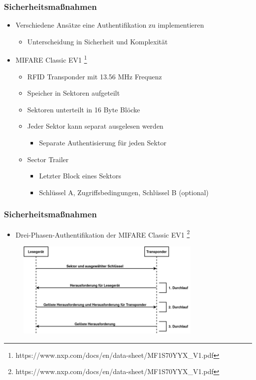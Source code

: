 \documentclass{beamer}
\begin{document}
\begin{frame}
\frametitle{Sicherheitsmaßnahmen}

\begin{itemize}
	\item Verschiedene Ansätze eine Authentifikation zu implementieren
	\begin{itemize}
		\item Unterscheidung in Sicherheit und Komplexität
	\end{itemize}
	
	\item MIFARE Classic EV1 \footnote{https://www.nxp.com/docs/en/data-sheet/MF1S70YYX\_V1.pdf}
	\begin{itemize}
		\item RFID Transponder mit 13.56 MHz Frequenz
		\item Speicher in Sektoren aufgeteilt
		\item Sektoren unterteilt in 16 Byte Blöcke
		\item Jeder Sektor kann separat ausgelesen werden
		\begin{itemize}
			\item Separate Authentisierung für jeden Sektor
		\end{itemize}
		\item Sector Trailer
		\begin{itemize}
			\item Letzter Block eines Sektors
			\item Schlüssel A, Zugriffsbedingungen, Schlüssel B (optional)
		\end{itemize}
	\end{itemize}
\end{itemize}
\end{frame}


\begin{frame}
\frametitle{Sicherheitsmaßnahmen}

\begin{itemize}
	\item Drei-Phasen-Authentifikation der MIFARE Classic EV1 \footnote{https://www.nxp.com/docs/en/data-sheet/MF1S70YYX\_V1.pdf}
\end{itemize}

\begin{figure}
\includegraphics[width=0.8\textwidth]{img/three_pass.png}
\end{figure}
\end{frame}
\end{document}
